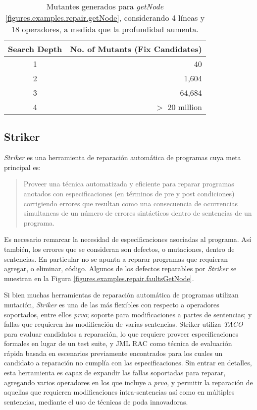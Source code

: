 \begin{table}[t]
	\begin{center}
		\small
		\begin{tabular}{c r}
			Search Depth                            &	No. of Mutants (Fix Candidates)        \\
			\hline
			1 					&	40		                               	\\
			2 					&	1,604			                \\
			3 					&	64,684		        	        \\
			4 					&	$>$ 20 million		                
		\end{tabular}
		\normalsize
	\end{center}
	\caption{Mutantes generados para \emph{getNode} \ref{figures.examples.repair.getNode}, considerando 4 l\'ineas y 18 operadores, a medida que la profundidad aumenta.}
	\label{tables.repair.mutation.explosion}
\end{table}


\subsection{Striker}
\label{sec:repair.striker}

\emph{Striker} es una herramienta de reparaci\'on autom\'atica de programas cuya meta principal es:
\begin{quote}
	Proveer una t\'ecnica automatizada y eficiente para reparar programas anotados con especificaciones (en t\'erminos de pre y post condiciones) corrigiendo errores que resultan como una consecuencia de ocurrencias simultaneas de un n\'umero de errores sint\'acticos dentro de sentencias de un programa.
\end{quote}
Es necesario remarcar la necesidad de especificaciones asociadas al programa. As\'i tambi\'en, los errores que se consideran son defectos, o mutaciones, dentro de sentencias. En particular no se apunta a reparar programas que requieran agregar, o eliminar, c\'odigo. Algunos de los defectos reparables por \emph{Striker} se muestran en la Figura \ref{figures.examples.repair.faultsGetNode}.

Si bien muchas herramientas de reparaci\'on autom\'atica de programas utilizan mutaci\'on, \emph{Striker} es una de las m\'as flexibles con respecto a operadores soportados, entre ellos \emph{prvo}; soporte para modificaciones a partes de sentencias; y fallas que requieren las modificaci\'on de varias sentencias. Striker utiliza \emph{TACO} \cite{bibliography.mutation.tools.TACOGaleottiRPF13} para evaluar candidatos a reparaci\'on, lo que requiere proveer especificaciones formales en lugar de un test suite, y JML RAC \cite{bibliography.misc.JMLRAC.LeavensCCRC02} como t\'ecnica de evaluaci\'on r\'apida basada en escenarios previamente encontrados para los cuales un candidato a reparaci\'on no cumpl\'ia con las especificaciones. Sin entrar en detalles, esta herramienta es capaz de expandir las fallas soportadas para reparar, agregando varios operadores en los que incluye a \emph{prvo}, y permitir la reparaci\'on de aquellas que requieren modificaciones intra-sentencias as\'i como en m\'ultiples sentencias, mediante el uso de t\'ecnicas de poda innovadoras.

